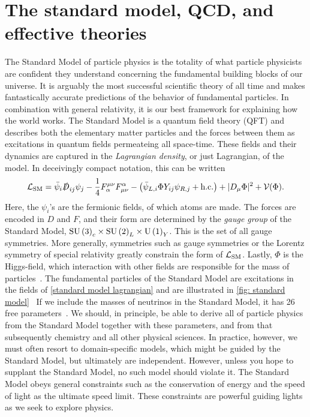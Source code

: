 \section{The standard model, QCD, and effective theories}


The Standard Model of particle physics is the totality of what particle physicists are confident they understand concerning the fundamental building blocks of our universe.
It is arguably the most successful scientific theory of all time and makes fantastically accurate predictions of the behavior of fundamental particles.
In combination with general relativity, it is our best framework for explaining how the world works.
The Standard Model is a quantum field theory (QFT) and describes both the elementary matter particles and the forces between them as excitations in quantum fields permeateing all space-time.
These fields and their dynamics are captured in the \emph{Lagrangian density}, or just Lagrangian, of the model.
In deceivingly compact notation, this can be written
%
\begin{equation}
    \label{standard model lagrangian}
    \mathcal{L}_\text{SM}
    =
    \bar \psi_i \slashed{ D }_{ij}  \psi_j
    - \frac{1}{4} F_\alpha^{\mu\nu} F^\alpha_{\mu \nu}
    - \left( 
        \bar \psi_{L, i} \Phi Y_{ij} \psi_{R, j}
        + \text{h.c.}
    \right)
    + |D_{\mu} \Phi |^2 + \mathcal{V}(\Phi).
\end{equation}
%
Here, the $\psi_i$'s are the fermionic fields, of which atoms are made.
The forces are encoded in $D$ and $F$, and their form are determined by the \emph{gauge group} of the Standard Model, $ \text{SU}\left(3\right)_c\times \text{SU}\left(2\right)_L\times \text{U}\left(1\right)_Y$.
This is the set of all gauge symmetries.
More generally, symmetries such as gauge symmetries or the Lorentz symmetry of special relativity greatly constrain the form of $\mathcal{L}_\text{SM}$.
Lastly, $\Phi$ is the Higgs-field, which interaction with other fields are responsible for the mass of particles~\autocite{carrollWorldEverydayExperience2013,schwartzQuantumFieldTheory2013}.
The fundamental particles of the Standard Model are excitations in the fields of \autoref{standard model lagrangian} and are illustrated in \autoref{fig: standard model}~\autocite{griffithsIntroductionElementaryParticles2008,schwartzQuantumFieldTheory2013}
If we include the masses of neutrinos in the Standard Model, it has 26 free parameters~\autocite{kramerStandardModelParticle2017}.
We should, in principle, be able to derive all of particle physics from the Standard Model together with these parameters, and from that subsequently chemistry and all other physical sciences.
In practice, however, we must often resort to domain-specific models, which might be guided by the Standard Model, but ultimately are independent.
However, unless you hope to supplant the Standard Model, no such model should violate it.
The Standard Model obeys general constraints such as the conservation of energy and the speed of light as the ultimate speed limit.
These constraints are powerful guiding lights as we seek to explore physics.



